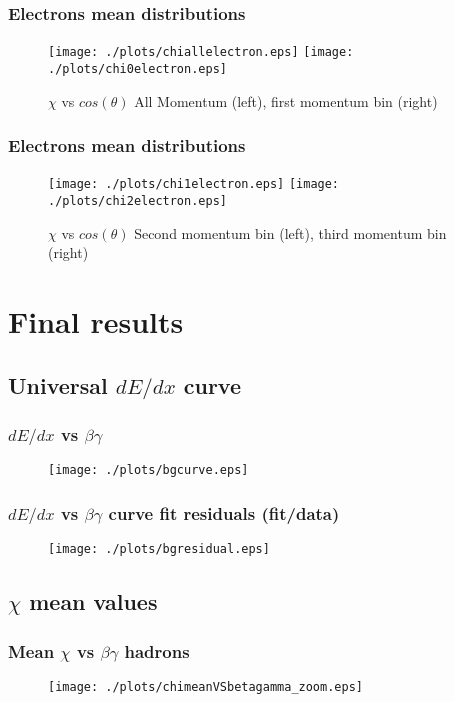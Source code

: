 \documentclass{beamer}
\begin{document}
\begin{frame}\frametitle{Electrons mean distributions}
\begin{figure}[!htp]
\centering
\texttt{[image: ./plots/chiallelectron.eps]}
\texttt{[image: ./plots/chi0electron.eps]}
\caption{$\chi$ vs $cos(\theta)$ All Momentum (left), first momentum bin (right)}
\end{figure}
\end{frame}

\begin{frame}\frametitle{Electrons mean distributions}
\begin{figure}[!htp]
\centering
\texttt{[image: ./plots/chi1electron.eps]}
\texttt{[image: ./plots/chi2electron.eps]}
\caption{$\chi$ vs $cos(\theta)$ Second momentum bin (left), third momentum bin (right)}
\end{figure}
\end{frame}



\section{Final results}
\subsection{Universal $dE/dx$ curve}
\begin{frame}\frametitle{ $dE/dx$ vs $\beta \gamma$}
\begin{figure}
\texttt{[image: ./plots/bgcurve.eps]} 
\end{figure}
\end{frame}

\begin{frame}\frametitle{ $dE/dx$ vs $\beta \gamma$ curve fit residuals (fit/data)}
\begin{figure}
\texttt{[image: ./plots/bgresidual.eps]} 
\end{figure}
\end{frame}


\subsection{$\chi$ mean values}
\begin{frame}\frametitle{Mean $\chi$ vs $\beta \gamma$ hadrons}
\begin{figure}
\texttt{[image: ./plots/chimeanVSbetagamma\_zoom.eps]} 
\end{figure}
\end{frame}
\end{document}
